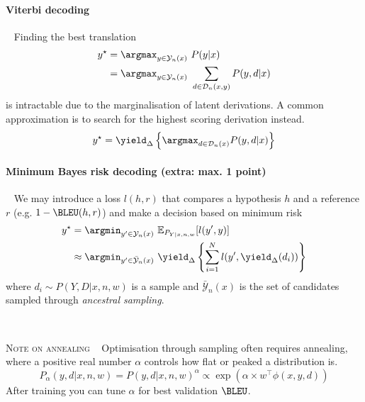 \paragraph{Viterbi decoding} ~ Finding the best translation 
\begin{equation}\label{eq:besty}
\begin{aligned}
y^\star &= \argmax_{y \in \mathcal Y_n(x)} ~ P(y|x) \\
 &= \argmax_{y \in \mathcal Y_n(x)} ~ \sum_{d \in \mathcal D_n(x, y)} P(y, d|x)
\end{aligned}
\end{equation}
is intractable due to the marginalisation of latent derivations. A common approximation is to search for the highest scoring derivation instead.
\begin{equation}
y^\star = \yield_\Delta \left\{ \argmax_{d \in \mathcal D_n(x)} P(y, d|x) \right\}
\end{equation}


\paragraph{Minimum Bayes risk decoding (extra: max. 1 point)}  ~ We may introduce a loss $l(h, r)$ that compares a hypothesis $h$ and a reference $r$ (e.g. $1 - \BLEU(h, r)$) and make a decision based on minimum risk
\begin{equation}
\begin{aligned}
y^\star &= \argmin_{y' \in \mathcal Y_n(x)} ~ \mathbb E_{P_{Y|x, n, w}}[l(y', y)]  \\
 &\approx \argmin_{y' \in \bar{\mathcal Y}_n(x)} ~ \yield_\Delta \left\{ \sum_{i=1}^N  l(y', \yield_\Delta(d_i)) \right\} 
\end{aligned}
\end{equation}
where $d_i \sim P(Y, D|x, n, w)$ is a sample and $\bar{\mathcal Y}_n(x)$ is the set of candidates sampled through \emph{ancestral sampling}.

~

\noindent\textsc{Note on annealing} ~ Optimisation through sampling often requires annealing, where a positive real number $\alpha$ controls how flat or peaked a distribution is.
\begin{equation}
	P_\alpha(y, d|x, n, w) = P(y, d|x, n, w)^\alpha \propto \exp\left(\alpha \times w^\top \phi(x, y, d)\right)
\end{equation}
After training you can tune $\alpha$ for best validation $\BLEU$.

